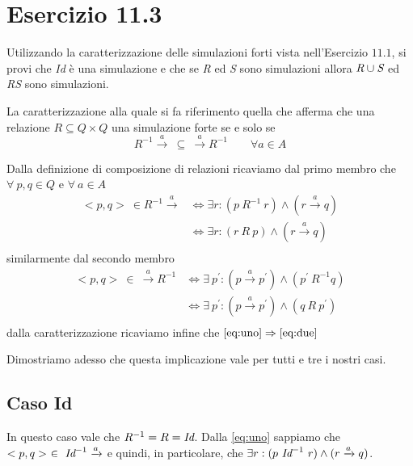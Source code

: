 		\newpage
		
	\section{Esercizio 11.3}
		Utilizzando la caratterizzazione delle simulazioni forti vista
		nell'Esercizio $11.1$, si provi che \emph{Id} \`e una simulazione e che se
		\emph{R} ed \emph{S} sono simulazioni allora $\emph{R} \cup \emph{S}$ ed
		\emph{RS} sono simulazioni.
		
		\sectionline
		La caratterizzazione alla quale si fa riferimento \eacc quella che afferma che una relazione $R \subseteq Q \times Q$ \eacc una simulazione forte se e solo se $$R^{-1} \xrightarrow{a} \ \subseteq \ \xrightarrow{a}R^{-1} \qquad \forall a \in A$$
		
		Dalla definizione di composizione di relazioni ricaviamo dal primo membro che $\forall \ p,q \in Q$ e $\forall \ a \in A$
		\begin{equation}
		\label{eq:uno}
		\begin{aligned}
		<p,q>\ \in R^{-1}\xrightarrow{a} & \Leftrightarrow \exists r: (p \ R^{-1} \ r) \land (r \xrightarrow{a} q)\\
		& \Leftrightarrow \exists r: (r \ R \ p) \land (r \xrightarrow{a} q)\\
		\end{aligned}
		\end{equation}
		similarmente dal secondo membro
		\begin{equation}
		\label{eq:due}
		\begin{aligned}
		<p,q>\ \in \ \xrightarrow{a} R^{-1} & \Leftrightarrow \exists \ p^{'}: (p \xrightarrow{a} p^{'}) \land (p^{'} \ R^{-1} q)\\
		& \Leftrightarrow \exists \ p^{'}: (p \xrightarrow{a} p^{'}) \land (q \ R \ p^{'})\\
		\end{aligned}
		\end{equation}
		dalla caratterizzazione ricaviamo infine che $\eqref{eq:uno} \Rightarrow \eqref{eq:due}$
		
		Dimostriamo adesso che questa implicazione vale per tutti e tre i nostri casi.
		
		\subsection{Caso Id}
		
			In questo caso vale che $R^{-1} = R = \emph{Id}$. Dalla \eqref{eq:uno} sappiamo che $<p,q>\ \in \ \emph{Id}^{-1} \xrightarrow{a}$ e quindi, in particolare, che $\exists r: (p \ \emph{Id}^{-1} \ r) \land (r \xrightarrow{a} q)$.
			
